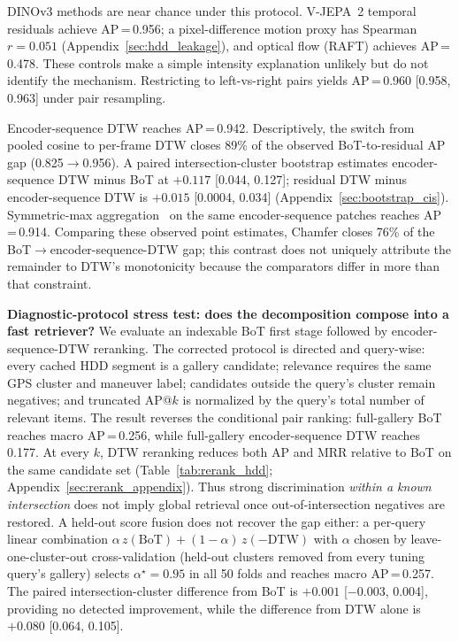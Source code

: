 \documentclass{article}
\theoremstyle{remark}
\begin{document}
DINOv3 methods are near chance under this protocol. V-JEPA~2 temporal residuals achieve AP\,=\,0.956; a pixel-difference motion proxy has Spearman $r = 0.051$ (Appendix~\ref{sec:hdd_leakage}), and optical flow (RAFT) achieves AP\,=\,0.478. These controls make a simple intensity explanation unlikely but do not identify the mechanism. Restricting to left-vs-right pairs yields AP\,=\,0.960 [0.958, 0.963] under pair resampling.

Encoder-sequence DTW reaches AP\,=\,0.942. Descriptively, the switch from pooled cosine to per-frame DTW closes 89\% of the observed BoT-to-residual AP gap (0.825$\to$0.956). A paired intersection-cluster bootstrap estimates encoder-sequence DTW minus BoT at $+0.117$ [0.044, 0.127]; residual DTW minus encoder-sequence DTW is $+0.015$ [0.0004, 0.034] (Appendix~\ref{sec:bootstrap_cis}). Symmetric-max aggregation~\cite{kordopatis2019visil} on the same encoder-sequence patches reaches AP\,=\,0.914. Comparing these observed point estimates, Chamfer closes 76\% of the BoT$\to$encoder-sequence-DTW gap; this contrast does not uniquely attribute the remainder to DTW's monotonicity because the comparators differ in more than that constraint.

\textbf{Diagnostic-protocol stress test: does the decomposition compose into a fast retriever?} We evaluate an indexable BoT first stage followed by encoder-sequence-DTW reranking. The corrected protocol is directed and query-wise: every cached HDD segment is a gallery candidate; relevance requires the same GPS cluster and maneuver label; candidates outside the query's cluster remain negatives; and truncated AP@$k$ is normalized by the query's total number of relevant items. The result reverses the conditional pair ranking: full-gallery BoT reaches macro AP\,=\,0.256, while full-gallery encoder-sequence DTW reaches 0.177. At every $k$, DTW reranking reduces both AP and MRR relative to BoT on the same candidate set (Table~\ref{tab:rerank_hdd}; Appendix~\ref{sec:rerank_appendix}). Thus strong discrimination \emph{within a known intersection} does not imply global retrieval once out-of-intersection negatives are restored. A held-out score fusion does not recover the gap either: a per-query linear combination $\alpha\,z(\text{BoT}) + (1{-}\alpha)\,z(-\text{DTW})$ with $\alpha$ chosen by leave-one-cluster-out cross-validation (held-out clusters removed from every tuning query's gallery) selects $\alpha^\star\!=\!0.95$ in all 50 folds and reaches macro AP\,=\,0.257. The paired intersection-cluster difference from BoT is $+0.001$ [$-0.003$, 0.004], providing no detected improvement, while the difference from DTW alone is $+0.080$ [0.064, 0.105].
\end{document}
